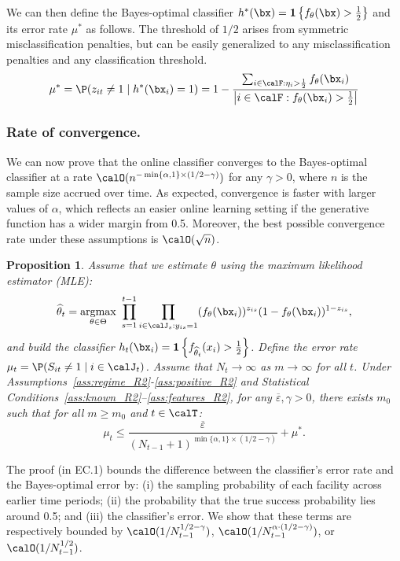 \documentclass[11pt]{article}
\DeclareMathOperator*{\argmax}{argmax}
\newtheorem{proposition}{Proposition}[]
\begin{document}
We can then define the Bayes-optimal classifier $h^*(\bx)=\mathbf{1}\left\{f_\theta(\bx)>\frac{1}{2}\right\}$ and its error rate $\mu^*$ as follows.  The threshold of $1/2$ arises from symmetric misclassification penalties, but can be easily generalized to any misclassification penalties and any classification threshold.
$$\mu^*=\P(z_{it}\neq1 \mid h^*(\bx_i)=1)=1-\frac{\sum_{i\in\calF:\eta_{i}>\frac{1}{2}}f_\theta(\bx_{i})}{\left|i\in\calF:f_\theta(\bx_{i})>\frac{1}{2}\right|}$$

\subsubsection*{Rate of convergence.}
We can now prove that the online classifier converges to the Bayes-optimal classifier at a rate $\calO(n^{-\min\{\alpha,1\}\times (1/2-\gamma)})$ for any $\gamma>0$, where $n$ is the sample size accrued over time. As expected, convergence is faster with larger values of $\alpha$, which reflects an easier online learning setting if the generative function has a wider margin from 0.5. Moreover, the best possible convergence rate under these assumptions is $\calO(\sqrt n)$.
\setcounter{proposition}{0}
\begin{proposition}\label{prop:MLE_R2}
       Assume that we estimate $\theta$ using the maximum likelihood estimator (MLE):
    \begin{equation}
        \widehat{\theta}_t= \argmax_{\theta\in\Theta} \ \prod_{s=1}^{t-1} \prod_{i\in\calJ_s:y_{is}=1} (f_\theta(\bx_{i}))^{z_{is}}(1-f_\theta(\bx_{i}))^{1-z_{is}}, \label{eq:mle_estimation_R2}
    \end{equation}
    and build the classifier
    $h_t(\bx_{i}) = \mathbf{1}\left\{f_{\widehat{\theta}_t}(x_{i})>\frac{1}{2}\right\}$. Define the error rate $\mu_t = \P(S_{it}\neq 1 \mid i\in\calJ_t)$. Assume that $N_t \to \infty$ as $m \to \infty$ for all $t$. Under Assumptions~\ref{ass:regime_R2}-\ref{ass:positive_R2} and Statistical Conditions~\ref{ass:known_R2}--\ref{ass:features_R2}, for any $\overline\varepsilon,\gamma>0$, there exists $m_0$ such that for all $m\geq m_0$ and $t\in\calT$:
    \[\mu_t \leq \frac{\overline\varepsilon}{(N_{t-1}+1)^{\min\{\alpha,1\}\times (1/2-\gamma)}}+\mu^*.\]
\end{proposition}

The proof (in EC.1) bounds the difference between the classifier's error rate and the Bayes-optimal error by: (i) the sampling probability of each facility across earlier time periods; (ii) the probability that the true success probability lies around 0.5; and (iii) the classifier's error. We show that these terms are respectively bounded by $\calO(1/N_{t-1}^{1/2-\gamma})$, $\calO(1/N_{t-1}^{\alpha\cdot(1/2-\gamma)})$, or $\calO(1/N_{t-1}^{1/2})$.
\end{document}
